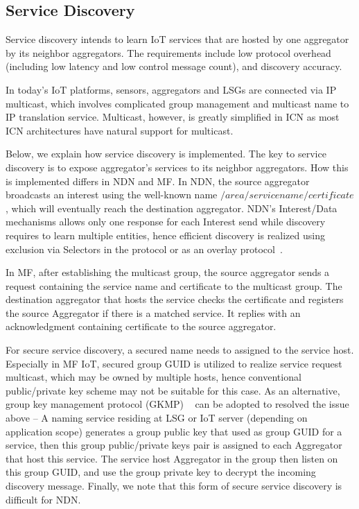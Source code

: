 \subsection{Service Discovery}
Service discovery intends to learn IoT services that are hosted by
one aggregator by its neighbor aggregators.  The requirements include
low protocol overhead (including low latency and low control message
count), and discovery accuracy.

In today's IoT platforms, sensors, aggregators and LSGs are connected
via IP multicast, which involves complicated group management and
multicast name to IP translation service.  Multicast, however, is
greatly simplified in ICN as most ICN architectures have natural
support for multicast.

Below, we explain how service discovery is implemented.  The key to
service discovery is to expose aggregator's services to its neighbor
aggregators.  How this is implemented differs in NDN and MF.  In NDN,
the source aggregator broadcasts an interest using the well-known
name $/area/servicename/certificate$, which will eventually reach the
destination aggregator.  NDN's Interest/Data mechanisms allows only
one response for each Interest send while discovery requires to learn
multiple entities, hence efficient discovery is realized using
exclusion via Selectors in the protocol or as an overlay protocol~\cite{ravindran2013information}.

In MF, after establishing the multicast group, the source aggregator sends a
request containing the service name and certificate to the multicast
group.  The destination aggregator that hosts the service checks the
certificate and registers the source Aggregator if there is a matched
service.  It replies with an acknowledgment containing certificate to
the source aggregator.

For secure service discovery, a secured name needs to assigned to the
service host.  Especially in MF IoT, secured group GUID is utilized
to realize service request multicast, which may be owned by multiple
hosts, hence conventional public/private key scheme may not be
suitable for this case.  As an alternative, group key management
protocol (GKMP) ~\cite{harney1997group} can be adopted to resolved the issue above -- A
naming service residing at LSG or IoT server (depending on
application scope) generates a group public key that used as group
GUID for a service, then this group public/private keys pair is
assigned to each Aggregator that host this service.  The service host
Aggregator in the group then listen on this group GUID, and use the
group private key to decrypt the incoming discovery message.
Finally, we note that this form of secure service discovery is
difficult for NDN.

